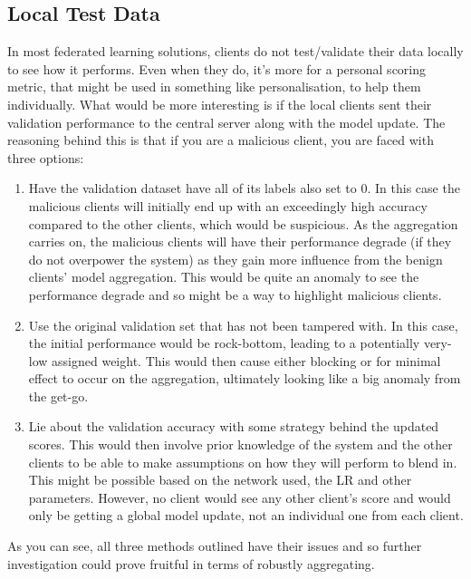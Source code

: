 \subsection{Local Test Data}
In most federated learning solutions, clients do not test/validate their data locally to see how it performs.
Even when they do, it's more for a personal scoring metric, that might be used in something like personalisation, to help them individually.
What would be more interesting is if the local clients sent their validation performance to the central server along with the model update.
The reasoning behind this is that if you are a malicious client, you are faced with three options:
\begin{enumerate}
    \item Have the validation dataset have all of its labels also set to 0.
    In this case the malicious clients will initially end up with an exceedingly high accuracy compared to the other clients, which would be suspicious.
    As the aggregation carries on, the malicious clients will have their performance degrade (if they do not overpower the system) as they gain more influence from the benign clients' model aggregation.
    This would be quite an anomaly to see the performance degrade and so might be a way to highlight malicious clients.
    
    \item Use the original validation set that has not been tampered with.
    In this case, the initial performance would be rock-bottom, leading to a potentially very-low assigned weight.
    This would then cause either blocking or for minimal effect to occur on the aggregation, ultimately looking like a big anomaly from the get-go.
    
    \item Lie about the validation accuracy with some strategy behind the updated scores.
    This would then involve prior knowledge of the system and the other clients to be able to make assumptions on how they will perform to blend in.
    This might be possible based on the network used, the LR and other parameters.
    However, no client would see any other client's score and would only be getting a global model update, not an individual one from each client.
\end{enumerate}

As you can see, all three methods outlined have their issues and so further investigation could prove fruitful in terms of robustly aggregating.


